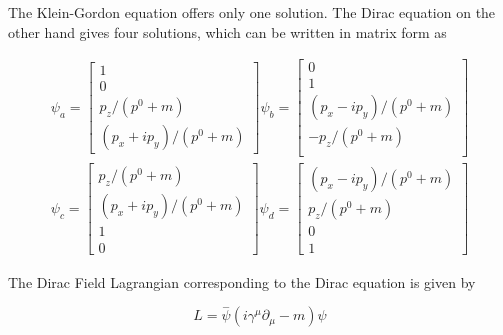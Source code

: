 The Klein-Gordon equation offers only one solution. The Dirac equation on the other hand gives four solutions, which can be written in matrix form as 


\begin{eqnarray}
\psi_a=\begin{bmatrix}
1\\
0\\
p_z/(p^0+m)\\
(p_x+ip_y)/(p^0+m)
\end{bmatrix}
\psi_b=\begin{bmatrix}
0\\
1\\
(p_x-ip_y)/(p^0+m)\\
-p_z/(p^0+m)\\
\end{bmatrix}\\
\psi_c=\begin{bmatrix}
p_z/(p^0+m)\\
(p_x+ip_y)/(p^0+m)\\
1\\
0
\end{bmatrix}
\psi_d=\begin{bmatrix}
(p_x-ip_y)/(p^0+m)\\
p_z/(p^0+m)\\
0\\
1
\end{bmatrix}
\end{eqnarray}

The Dirac Field Lagrangian corresponding to the Dirac equation is given by

\begin{equation}
{L} = \overset{-}{\psi}(i{\gamma^\mu}\partial_\mu-m)\psi
\end{equation}



